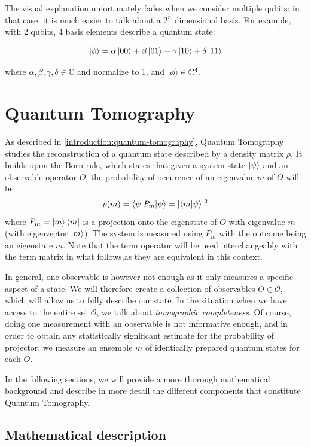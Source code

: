 \documentclass[12pt]{memoir}
\newcommand{\ti}{\textit}
\begin{document}
The visual explanation unfortunately fades when we consider multiple qubits: in that case, it is much easier to talk about a $2^n$ dimensional basis. For example, with 2 qubits, 4 basis elements describe a quantum state:

\begin{equation}
    \ket{\phi} = \alpha \ket{00} + \beta \ket{01} + \gamma \ket{10} + \delta \ket{11}
\end{equation}

where $\alpha,\beta,\gamma,\delta \in \mathbb C$ and normalize to 1, and $\ket{\phi} \in \mathbb{C}^4$.\medbreak

\section{Quantum Tomography}
As described in \ref{introduction:quantum-tomography}, Quantum Tomography studies the reconstruction of a quantum state described by a density matrix $\rho$. It builds upon the Born rule, which states that given a system state $\ket \psi$ and an observable operator $O$, the probability of occurence of an eigenvalue $m$ of $O$ will be 
\begin{equation}
    p(m) = \braket{\psi | P_m| \psi} = \lvert\braket{m|\psi}\rvert^2
\end{equation}
where $P_m = \ket m \bra m$ is a projection onto the eigenstate of $O$ with eigenvalue $m$ (with eigenvector $\ket m$). The system is measured using $P_m$ with the outcome being an eigenstate $m$. Note that the term operator will be used interchangeably with the term matrix in what follows,as they are equivalent in this context. \medbreak

In general, one observable is however not enough as it only measures a specific aspect of a state. We will therefore create a collection of observables $O \in \mathcal{O}$, which will allow us to fully describe our state. In the situation when we have access to the entire set $\mathcal{O}$, we talk about \ti{tomographic completeness}. Of course, doing one measurement with an observable is not informative enough, and in order to obtain any statistically significant estimate for the probability of projector, we measure an ensemble $m$ of identically prepared quantum states for each $O$. \medbreak

In the following sections, we will provide a more thorough mathematical background and describe in more detail the different components that constitute Quantum Tomography.
\subsection{Mathematical description} \label{background:Quantum Tomography:math}
\end{document}
